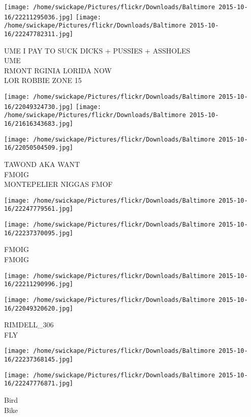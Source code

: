 \documentclass[10pt,letterpaper]{article}
\begin{document}
\texttt{[image: /home/swickape/Pictures/flickr/Downloads/Baltimore 2015-10-16/22211295036.jpg]}
\texttt{[image: /home/swickape/Pictures/flickr/Downloads/Baltimore 2015-10-16/22247782311.jpg]}

UME I PAY TO SUCK DICKS + PUSSIES + ASSHOLES\\
UME\\
RMONT RGINIA LORIDA NOW\\
LOR ROBBIE ZONE 15
\pagebreak

\texttt{[image: /home/swickape/Pictures/flickr/Downloads/Baltimore 2015-10-16/22049324730.jpg]}
\texttt{[image: /home/swickape/Pictures/flickr/Downloads/Baltimore 2015-10-16/21616343683.jpg]}

\vspace{0.25in}
\texttt{[image: /home/swickape/Pictures/flickr/Downloads/Baltimore 2015-10-16/22050504509.jpg]}

TAWOND AKA WANT\\
FMOIG\\
MONTEPELIER NIGGAS FMOF
\pagebreak

\texttt{[image: /home/swickape/Pictures/flickr/Downloads/Baltimore 2015-10-16/22247779561.jpg]}

\vspace{0.25in}
\texttt{[image: /home/swickape/Pictures/flickr/Downloads/Baltimore 2015-10-16/22237370095.jpg]}

FMOIG\\
FMOIG
\pagebreak

\texttt{[image: /home/swickape/Pictures/flickr/Downloads/Baltimore 2015-10-16/22211290996.jpg]}

\vspace{0.25in}
\texttt{[image: /home/swickape/Pictures/flickr/Downloads/Baltimore 2015-10-16/22049320620.jpg]}

RIMDELL\_306\\
FLY
\pagebreak

\texttt{[image: /home/swickape/Pictures/flickr/Downloads/Baltimore 2015-10-16/22237368145.jpg]}

\vspace{0.25in}
\texttt{[image: /home/swickape/Pictures/flickr/Downloads/Baltimore 2015-10-16/22247776871.jpg]}

Bird\\
Bike
\pagebreak
\end{document}
